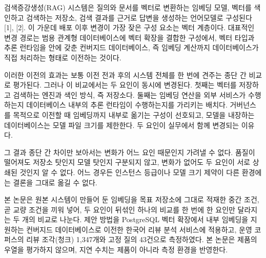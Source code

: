 \documentclass[10pt,a4paper,twocolumn]{article}
\newcommand{\pgsec}[1]{\par\vspace{5pt}{\bfseries\fontsize{12}{14}\selectfont #1}\par\nobreak\vspace{2pt}\nobreak}
\begin{document}
\pgsec{1. 서론}

검색증강생성(RAG) 시스템은 질의와 문서를 벡터로 변환하는 임베딩 모델, 벡터를 색인하고 검색하는 저장소, 검색 결과를 근거로 답변을 생성하는 언어모델로 구성된다 [1], [2]. 이 가운데 배포 이후 변경이 가장 잦은 구성 요소는 벡터 계층이다. 대표적인 변경 경로는 범용 관계형 데이터베이스에 벡터 확장을 결합한 구성에서, 벡터 타입과 추론 런타임을 안에 갖춘 컨버지드 데이터베이스, 즉 임베딩 계산까지 데이터베이스가 직접 처리하는 형태로 이전하는 것이다.

이러한 이전의 효과는 보통 이전 전과 후의 시스템 전체를 한 번에 견주는 종단 간 비교로 평가된다. 그러나 이 비교에서는 두 요인이 동시에 변경된다. 첫째는 벡터를 저장하고 검색하는 엔진과 색인 방식, 즉 저장소다. 둘째는 임베딩 연산을 외부 서비스가 수행하는지 데이터베이스 내부의 추론 런타임이 수행하는지를 가리키는 배치다. 거버넌스를 목적으로 이전할 때 임베딩까지 내부로 옮기는 구성이 선호되고, 모델을 내장하는 데이터베이스는 모델 파일 크기를 제한한다. 두 요인이 실무에서 함께 변경되는 이유다.

그 결과 종단 간 차이만 보아서는 변화가 어느 요인 때문인지 가려낼 수 없다. 품질이 떨어져도 저장소 탓인지 모델 탓인지 구분되지 않고, 변화가 없어도 두 요인이 서로 상쇄된 것인지 알 수 없다. 어느 경우든 인스턴스 등급이나 모델 크기 제약이 다른 환경에는 결론을 그대로 옮길 수 없다.

본 논문은 원본 시스템이 만들어 둔 임베딩을 목표 저장소에 그대로 적재한 중간 조건, 곧 교량 조건을 끼워 넣어, 두 요인이 뒤섞인 하나의 비교를 한 번에 한 요인만 달라지는 두 개의 비교로 나눈다. 제안 방법을 PostgreSQL 벡터 확장에서 내부 임베딩을 지원하는 컨버지드 데이터베이스로 이전한 한국어 리뷰 분석 서비스에 적용하고, 운영 코퍼스의 리뷰 조각(청크) 1,347개와 고정 질의 43건으로 측정하였다. 본 논문은 제품의 우열을 평가하지 않으며, 지연 수치는 제품이 아니라 측정 환경을 반영한다.

\pgsec{2. 제안 방법}
\end{document}
